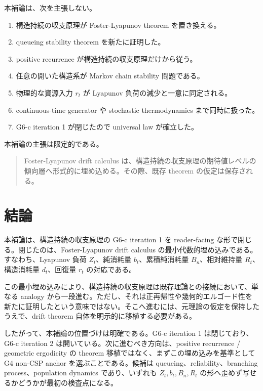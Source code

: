 \documentclass[12pt,a4paper]{article}
\begin{document}
本補論は、次を主張しない。

\begin{enumerate}
\def\labelenumi{\arabic{enumi}.}
\tightlist
\item
  構造持続の収支原理が Foster-Lyapunov theorem を置き換える。
\item
  queueing stability theorem を新たに証明した。
\item
  positive recurrence が構造持続の収支原理だけから従う。
\item
  任意の開いた構造系が Markov chain stability 問題である。
\item
  物理的な資源入力 \(r_{t}\) が Lyapunov 負荷の減少と一意に同定される。
\item
  continuous-time generator や stochastic thermodynamics まで同時に扱った。
\item
  G6-c iteration 1 が閉じたので universal law が確立した。
\end{enumerate}

本補論の主張は限定的である。

\begin{quote}
Foster-Lyapunov drift calculus は、構造持続の収支原理の期待値レベルの傾向層へ形式的に埋め込める。その際、既存 theorem の仮定は保存される。
\end{quote}

\section{結論}\label{ux7d50ux8ad6}

本補論は、構造持続の収支原理の G6-c iteration 1 を reader-facing な形で閉じる。閉じたのは、Foster-Lyapunov drift calculus の最小代数的埋め込みである。すなわち、Lyapunov 負荷 \(Z_{t}\)、純消耗量 \(b_{t}\)、累積純消耗量 \(B_{n}\)、相対維持量 \(R_{t}\)、構造消耗量 \(d_{t}\)、回復量 \(r_{t}\) の対応である。

この最小埋め込みにより、構造持続の収支原理は既存理論との接続において、単なる analogy から一段進む。ただし、それは正再帰性や幾何的エルゴード性を新たに証明したという意味ではない。そこへ進むには、元理論の仮定を保持したうえで、drift theorem 自体を明示的に移植する必要がある。

したがって、本補論の位置づけは明確である。G6-c iteration 1 は閉じており、G6-c iteration 2 は開いている。次に進むべき方向は、positive recurrence / geometric ergodicity の theorem 移植ではなく、まずこの埋め込みを基準として G4 non-CSP anchor を選ぶことである。候補は queueing、reliability、branching process、population dynamics であり、いずれも \(Z_{t},b_{t},B_{n},R_{t}\) の形へ歪めず写せるかどうかが最初の検査点になる。
\end{document}
